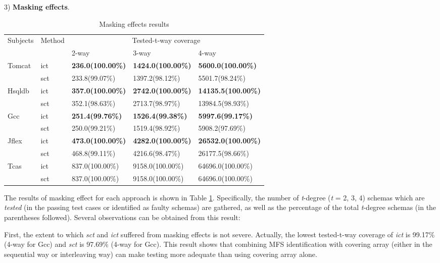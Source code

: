 \documentclass[10pt,journal,compsoc]{IEEEtran}
\begin{document}
3) \textbf{Masking effects}.

\begin{table}[ht]
\centering
\caption{Masking effects results}
\label{tested-t-way}
\begin{tabular}{|ll|lll|}
\hline
\multirow{2}{*}{Subjects} & \multirow{2}{*}{Method}& \multicolumn{3}{c|}{Tested-t-way coverage}      \\ \cline{3-5}
 &  & 2-way           & 3-way            & 4-way       \\ \hline
Tomcat	&ict	&\textbf{236.0}\textbf{(100.00\%)}	&\textbf{1424.0}\textbf{(100.00\%)}	&\textbf{5600.0}\textbf{(100.00\%)}	\\
	&sct	&233.8(99.07\%)	&1397.2(98.12\%)	&5501.7(98.24\%) 	\\\hline
Hsqldb	&ict	&\textbf{357.0}\textbf{(100.00\%)}	&\textbf{2742.0}\textbf{(100.00\%)}	&\textbf{14135.5}\textbf{(100.00\%)} \\
	&sct	&352.1(98.63\%)	&2713.7(98.97\%)	&13984.5(98.93\%) 	\\\hline
Gcc	&ict	&\textbf{251.4}\textbf{(99.76\%)}	&\textbf{1526.4}\textbf{(99.38\%)}	&\textbf{5997.6}\textbf{(99.17\%)} \\
	&sct	&250.0(99.21\%)	&1519.4(98.92\%)	&5908.2(97.69\%) 	\\\hline
Jflex	&ict	&\textbf{473.0}\textbf{(100.00\%)}	&\textbf{4282.0}\textbf{(100.00\%)}	&\textbf{26532.0}\textbf{(100.00\%)} \\
	&sct	&468.8(99.11\%)	&4216.6(98.47\%)	&26177.5(98.66\%)\\\hline
Tcas	&ict	&837.0(100.00\%)	&9158.0(100.00\%)	&64696.0(100.00\%) 	\\
	&sct	&837.0(100.00\%)	&9158.0(100.00\%)	&64696.0(100.00\%) \\\hline
\end{tabular}
\end{table}



The results of masking effect for each approach is shown in Table \ref{tested-t-way}.  Specifically, the number of \emph{t}-degree (\emph{t} = 2, 3, 4) schemas which are \emph{tested} (in the passing test cases or identified as faulty schemas) are gathered, as well as the percentage of the total \emph{t}-degree schemas (in the parentheses followed).
Several observations can be obtained from this result:


First, the extent to which \emph{sct} and \emph{ict} suffered from masking effects is not severe. Actually, the lowest tested-t-way coverage of \emph{ict} is 99.17\% (4-way for Gcc) and \emph{sct} is 97.69\% (4-way for Gcc). This result shows that combining MFS identification with covering array (either in the sequential way or interleaving way) can make testing more adequate than using covering array alone.
\end{document}
